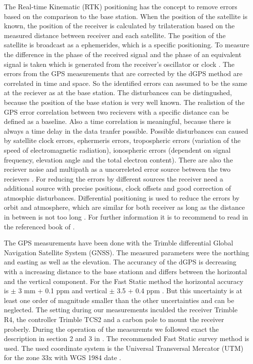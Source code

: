 The Real-time Kinematic (RTK) positioning has the concept to remove errors based on the comparison to the base station.
When the position of the satellite is known, the position of the receiver is calculated by trilateration based on the measured distance between receiver and each satellite.
The position of the satellite is broadcast as a ephemerides, which is a specific positioning.
To measure the difference in the phase of the received signal and the phase of an equivalent signal is taken which is generated from the receiver’s oscillator or clock \citep{Trprocess}.
The errors from the GPS measurements that are corrected by the dGPS method are correlated in time and space.
So the identified errors can assumed to be the same at the reciever as at the base station.
The disturbances can be distingushed, because the position of the base station is very well known.
The realistion of the GPS error correlation between two recievers with a specific distance can be defined as a baseline.
Also a time correlation is meaningful, because there is always a time delay in the data tranfer possible.
Possible disturbances can caused by satellite clock errors, ephermeris errors, tropospheric errors (variation of the speed of electromagnetic radiation), ionospheric errors (dependent on signal frequency, elevation angle and the total electron content). 
There are also the reciever noise and multipath as a uncorreleted error source between the two recievers \citep{UGPS}.
For reducing the errors by different sources the receiver need a additional source with precise positions, clock offsets and good correction of atmosphic disturbances. 
Differential positioning is used to reduce the errors by orbit and atmosphere, which are similar for both receiver as long as the distance in between is not too long \citep{Trprocess}.
For further information it is to recommend to read in the referenced book of \citep{UGPS}.
\medskip

The GPS measurements have been done with the Trimble differential Global Navigation Satellite System (GNSS). 
The measured parameters were the northing and easting as well as the elevation.
The accurancy of the dGPS is decreasing with a increasing distance to the base stationn and differs between the horizontal and the vertical component.
For the Fast Static method the horizontal accuracy is $ \pm $ 3 mm + 0.1 ppm and vertical $ \pm $ 3.5 + 0.4 ppm  \citep{Trquickstart}.
But this uncertainty is at least one order of magnitude smaller than the other uncertainties and can be neglected.  
The setting during our measurements inculded the receiver Trimble R4, the controller Trimble TCS2 and a carbon pole to mount the receiver proberly.
During the operation of the measuremts we followed exact the description in section 2 and 3 in \cite{Trquickstart}. 
The recommended Fast Static survey method is used.
The used coordinate system is the Universal Transversal Mercator (UTM) for the zone 33x with WGS 1984 date \citep{Trquickstart}. 
\medskip

